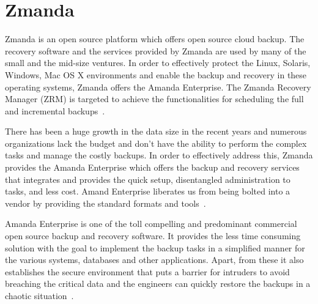 \section{Zmanda}
Zmanda is an open source platform which offers open source cloud backup. 
The recovery software and the services provided by Zmanda are used by 
many of the small and the mid-size ventures. In order to effectively 
protect the Linux, Solaris, Windows, Mac OS X environments and enable 
the backup and recovery in these operating systems, Zmanda offers 
the Amanda Enterprise. The Zmanda Recovery Manager (ZRM) is targeted to 
achieve the functionalities for scheduling the full 
and incremental backups~\cite{hid-sp18-412-zmanda_crunchbase}.

There has been a huge growth in the data size in the recent years and 
numerous organizations lack the budget and don't have the ability to 
perform the complex tasks and manage the
costly backups. In order to effectively address this, Zmanda
provides the Amanda Enterprise which offers the backup and recovery services 
that integrates and provides the quick setup, disentangled administration 
to tasks, and less cost. Amand Enterprise liberates us from being bolted 
into a vendor by providing the standard 
formats and tools~\cite{hid-sp18-412-zmanda_amanda}.


Amanda Enterprise is one of the toll compelling and predominant 
commercial open source backup and recovery software. It provides the 
less time consuming solution with the goal to implement the backup tasks 
in a simplified manner for the various systems, databases 
and other applications. Apart, from these it also establishes the 
secure environment that puts a barrier for intruders to avoid 
breaching the critical data and the engineers can quickly restore 
the backups in a chaotic situation~\cite{hid-sp18-412-zmanda_webinar}.

